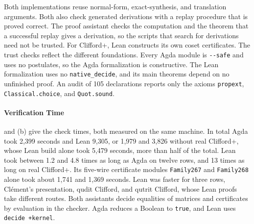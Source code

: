 \documentclass[acmsmall,screen,nonacm]{acmart}
\begin{document}
Both implementations reuse normal-form, exact-synthesis, and translation arguments. Both also check generated derivations with a replay procedure that is proved correct. The proof assistant checks the computation and the theorem that a successful replay gives a derivation, so the scripts that search for derivations need not be trusted. For Clifford+\CS, Lean constructs its own coset certificates. The trust checks reflect the different foundations. Every Agda module is \texttt{-{}-safe} and uses no postulates, so the Agda formalization is constructive. The Lean formalization uses no \texttt{native\_decide}, and its main theorems depend on no unfinished proof. An audit of 105 declarations reports only the axioms \texttt{propext}, \texttt{Classical.choice}, and \texttt{Quot.sound}.

\paragraph{Verification Time}  and (b) give the check times, both measured on the same machine. In total Agda took 2{,}399 seconds and Lean 9{,}305, or 1{,}979 and 3{,}826 without real Clifford+\CH, whose Lean build alone took 5{,}479 seconds, more than half of the total. Lean took between 1.2 and 4.8 times as long as Agda on twelve rows, and 13 times as long on real Clifford+\CH. Its five-wire certificate modules \texttt{Family267} and \texttt{Family268} alone took about 1{,}741 and 1{,}369 seconds. Lean was faster for three rows, Cl\'ement's presentation, qudit Clifford, and qutrit Clifford, whose Lean proofs take different routes. Both assistants decide equalities of matrices and certificates by evaluation in the checker. Agda reduces a Boolean to \texttt{true}, and Lean uses \texttt{decide +kernel}.
\end{document}
